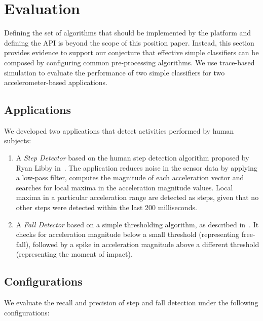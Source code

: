 \section{Evaluation}
\label{sec:validation}

Defining the set of algorithms that should be implemented by the
platform and defining the API is beyond the scope of this position
paper.  Instead, this section provides evidence to support our
conjecture that effective simple classifiers can be composed by
configuring common pre-processing algorithms.  We use trace-based
simulation to evaluate the performance of two simple classifiers for
two accelerometer-based applications.


\subsection{Applications}

We developed two applications that detect activities performed by 
human subjects:

\begin{enumerate}
\setlength{\itemsep}{-3pt}  

\item A {\em Step Detector} based on the human step detection algorithm
  proposed by Ryan Libby in~\cite{libbyFootstepDetection}. The
  application reduces noise in the sensor data by applying a low-pass 
  filter, computes the magnitude of each acceleration vector and searches 
  for local maxima in the acceleration magnitude values. Local maxima
  in a particular acceleration range are detected as steps, given
  that no other steps were detected within the last 200 milliseconds.

\item A {\em Fall Detector} based on a simple thresholding algorithm,
  as described in~\cite{kangasFallDetection}.  It checks for acceleration magnitude 
  below a small threshold (representing free-fall), followed by a spike in acceleration magnitude 
  above a different threshold (representing the moment of impact).

\end{enumerate}

\subsection{Configurations}

We evaluate the recall and precision of step and fall detection under the following configurations:

